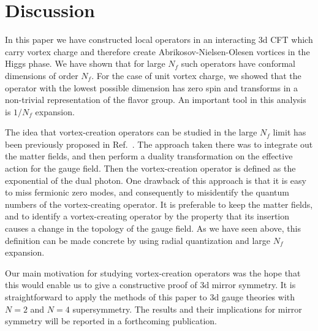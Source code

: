 \documentclass[a4paper,12pt, amsfonts, amssymb]{article}
\begin{document}
\section{Discussion}

In this paper we have constructed local operators in an interacting
3d CFT which carry vortex charge and therefore create 
Abrikosov-Nielsen-Olesen vortices in the Higgs phase. We have shown that 
for large $N_f$ such operators have conformal dimensions of order $N_f$. For the case of unit vortex charge, we showed that the operator with the
lowest possible dimension has zero spin and transforms in a non-trivial
representation of the flavor group. An important tool in this analysis
is $1/N_f$ expansion. 

The idea that vortex-creation operators can be studied in the large $N_f$
limit has been previously proposed in Ref.~\cite{KS}. The approach taken there
was to integrate out the matter fields, and then perform a duality
transformation on the effective action for the gauge field. Then the vortex-creation operator is defined as the exponential of the dual photon. 
One drawback of this approach is that it is easy to miss fermionic
zero modes, and consequently to misidentify the quantum numbers of the
vortex-creating operator. It is preferable to keep the matter fields,
and to identify a vortex-creating operator by the property that its insertion
causes a change in the topology of the gauge field. As we have seen above,
this definition can be made concrete by using radial quantization and
large $N_f$ expansion.

Our main motivation for studying vortex-creation operators was the hope
that this would enable us to give a constructive proof of 3d mirror
symmetry. It is straightforward to apply the methods of this paper
to 3d gauge theories with $N=2$ and $N=4$ supersymmetry.
The results and their implications for mirror symmetry will be reported
in a forthcoming publication.
\end{document}
